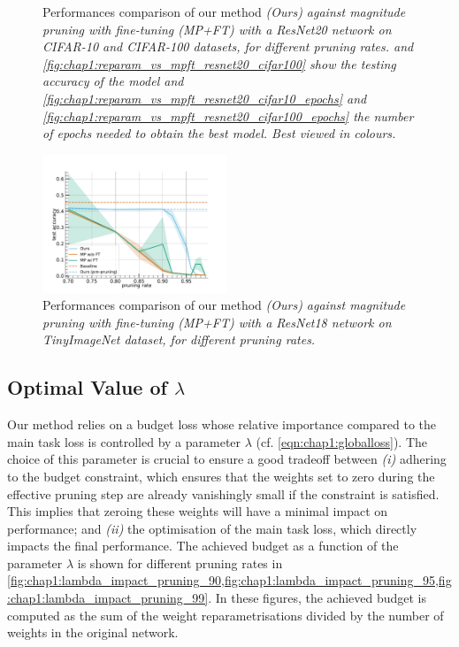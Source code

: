 \begin{figure}
  \caption{ Performances comparison of our method \em{(Ours)} against
    magnitude pruning with fine-tuning \em{(MP+FT)} with a ResNet20 network on
    CIFAR-10 and CIFAR-100 datasets, for different pruning rates.
     and
    \cref{fig:chap1:reparam_vs_mpft_resnet20_cifar100} show the
    testing accuracy of the model and
    \cref{fig:chap1:reparam_vs_mpft_resnet20_cifar10_epochs} and
    \cref{fig:chap1:reparam_vs_mpft_resnet20_cifar100_epochs}
    the number of epochs needed to obtain the best model. Best viewed in colours.}
  \label{fig:chap1:reparam_vs_mpft_resnet20}
\end{figure}


\begin{figure}
  \centering
  \includegraphics[width=0.49\textwidth]{chapter_1/assets/reparam_vs_mpft_PrunableResNet18_tinyimagenet.pdf}
  \caption{Performances comparison of our method \em{(Ours)} against
    magnitude pruning with fine-tuning \em{(MP+FT)} with a ResNet18 network on
    TinyImageNet dataset, for different pruning rates.}
  \label{fig:chap1:reparam_vs_mpft_resnet18}
\end{figure}



\subsection{Optimal Value of \texorpdfstring{$\lambda$}{Lambda}}
\label{sec:chap1:impact_of_lambda}


Our method relies on a budget loss whose relative importance compared to the
main task loss is controlled by a parameter $\lambda$ (cf.
\cref{eqn:chap1:globalloss}). The choice of this parameter is crucial to ensure
a good tradeoff between \emph{(i)} adhering to the budget constraint, which
ensures that the weights set to zero during the effective pruning step are
already vanishingly small if the constraint is satisfied. This implies that
zeroing these weights will have a minimal impact on performance; and \emph{(ii)}
the optimisation of the main task loss, which directly impacts the final
performance. The achieved budget as a function of the parameter $\lambda$ is
shown for different pruning rates in
\cref{fig:chap1:lambda_impact_pruning_90,fig:chap1:lambda_impact_pruning_95,fig:chap1:lambda_impact_pruning_99}.
In these figures, the achieved budget is computed as the sum of the weight
reparametrisations divided by the number of weights in the original network.\\

